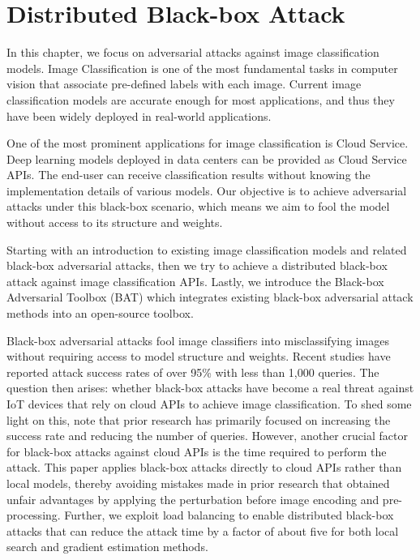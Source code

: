 \chapter{Distributed Black-box Attack}
\label{chpt:classification}


In this chapter, we focus on adversarial attacks against image classification models. Image Classification is one of the most fundamental tasks in computer vision that associate pre-defined labels with each image. Current image classification models are accurate enough for most applications, and thus they have been widely deployed in real-world applications.

One of the most prominent applications for image classification is Cloud Service. Deep learning models deployed in data centers can be provided as Cloud Service APIs. The end-user can receive classification results without knowing the implementation details of various models. Our objective is to achieve adversarial attacks under this black-box scenario, which means we aim to fool the model without access to its structure and weights.

Starting with an introduction to existing image classification models and related black-box adversarial attacks, then we try to achieve a distributed black-box attack against image classification APIs. Lastly, we introduce the Black-box Adversarial Toolbox (BAT) which integrates existing black-box adversarial attack methods into an open-source toolbox.


Black-box adversarial attacks fool image classifiers into misclassifying images without requiring access to model structure and weights. Recent studies have reported attack success rates of over 95\% with less than 1,000 queries. The question then arises: whether black-box attacks have become a real threat against IoT devices that rely on cloud APIs to achieve image classification. To shed some light on this, note that prior research has primarily focused on increasing the success rate and reducing the number of queries. However, another crucial factor for black-box attacks against cloud APIs is the time required to perform the attack. This paper applies black-box attacks directly to cloud APIs rather than local models, thereby avoiding mistakes made in prior research that obtained unfair advantages by applying the perturbation before image encoding and pre-processing. Further, we exploit load balancing to enable distributed black-box attacks that can reduce the attack time by a factor of about five for both local search and gradient estimation methods. 

